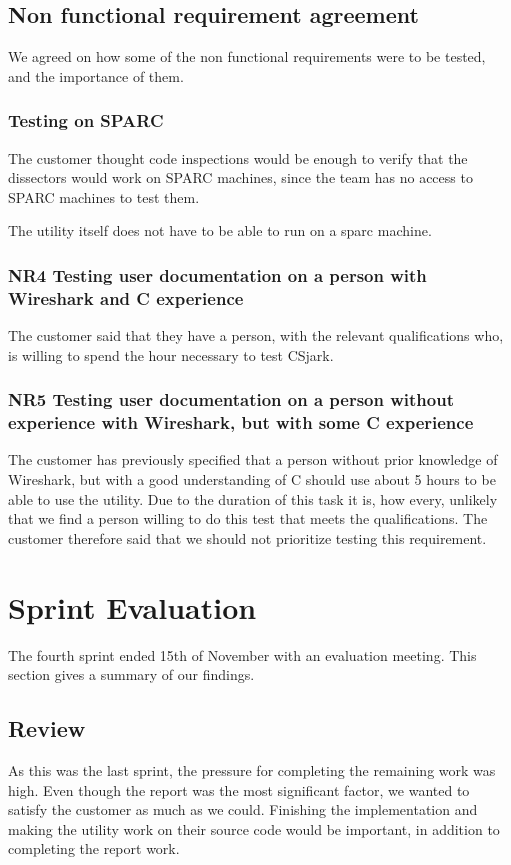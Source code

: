 \subsection{Non functional requirement agreement}
We agreed on how some of the non functional requirements were to be tested, and the importance of them.

\subsubsection{Testing on SPARC}
The customer thought code inspections would be enough to verify that the dissectors would work on SPARC machines, since the team has no access to SPARC machines to test them.

The utility itself does not have to be able to run on a sparc machine.

\subsubsection{NR4 Testing user documentation on a person with Wireshark and C experience}
The customer said that they have a person, with the relevant qualifications who, is willing to spend the hour necessary to test CSjark.

\subsubsection{NR5 Testing user documentation on a person without experience with Wireshark, but with some C experience}
The customer has previously specified that a person without prior knowledge of Wireshark, but with a good understanding of C should use about 5 hours to be able to use the utility. Due to the duration of this task it is, how every, unlikely that we find a person willing to do this test that meets the qualifications. The customer therefore said that we should not prioritize testing this requirement.


\section{Sprint Evaluation}
\label{sec:sp4eval}
The fourth sprint ended 15th of November with an evaluation meeting. This section gives a summary of our findings.

\subsection{Review}
As this was the last sprint, the pressure for completing the remaining work was high. Even though the report was the most significant factor, we wanted to satisfy the customer as much as we could. Finishing the implementation and making the utility work on their source code would be important, in addition to completing the report work.

